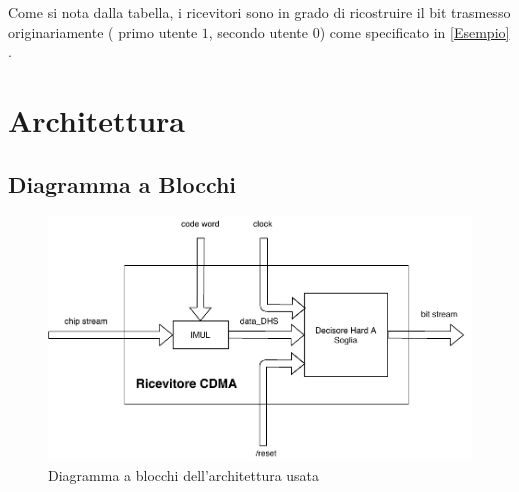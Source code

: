 \documentclass[a4paper,12pt]{article}
\begin{document}
    Come si nota dalla tabella, i ricevitori sono in grado di ricostruire il bit trasmesso originariamente ( primo utente
     $1$, secondo utente $0$) come specificato in \ref{Esempio} .

\section{Architettura}
  \subsection{Diagramma a Blocchi}
      \begin{figure}[H]
      \centering
      \includegraphics[width=\textwidth]{img/Architettura.pdf}
      \caption{ Diagramma a blocchi dell'architettura usata }
      \label{fig:Architettura}
    \end{figure}
\end{document}

